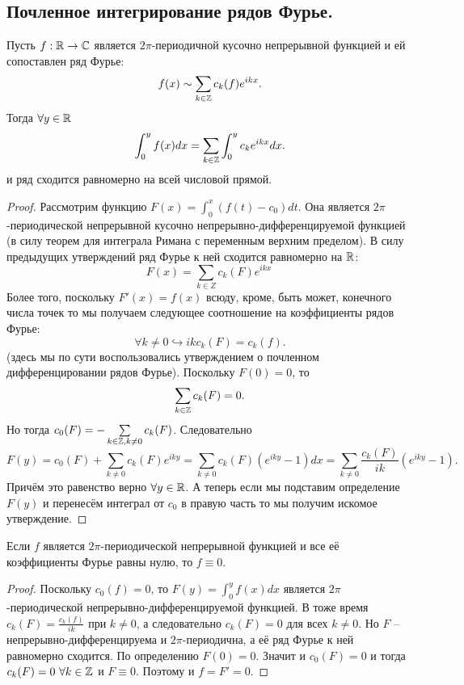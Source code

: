 \subsection{Почленное интегрирование рядов Фурье.}
\begin{theorem}
    Пусть $f: \mathbb{R} \to \mathbb{C}$ является $2\pi$-периодичной кусочно непрерывной функцией и ей сопоставлен ряд Фурье:
    \[
        f(x) \sim \sum\limits_{k \in \mathbb{Z}} c_k(f) e^{ikx}.
    \]
    Тогда $\forall y \in \mathbb{R}$
    \[
        \int_0^{y}f(x)dx = \sum\limits_{k \in \mathbb{Z}} \int_0^{y} c_k e^{ikx}dx.
    \]
    и ряд сходится равномерно на всей числовой прямой.
\end{theorem}
\begin{proof}
    Рассмотрим функцию $F(x) = \int_0^{x} (f(t) - c_0)dt$.
    Она является $2\pi$-периодической непрерывной кусочно непрерывно-дифференцируемой функцией (в силу теорем для интеграла Римана с переменным верхним пределом).
    В силу предыдущих утверждений ряд Фурье к ней сходится равномерно на $\mathbb{R}$:
    \[
        F(x) = \sum\limits_{k \in Z} c_k(F) e^{ikx} \
    \]
    Более того, поскольку $F'(x) = f(x)$ всюду, кроме, быть может, конечного числа точек то мы получаем следующее соотношение на коэффициенты рядов Фурье:
    \[
        \forall k \neq 0 \hookrightarrow ik c_k(F) = c_k(f).
    \]
    (здесь мы по сути воспользовались утверждением о почленном дифференцировании рядов Фурье).
    Поскольку $F(0) = 0$, то
    \[
        \sum\limits_{k \in \mathbb{Z}} c_k(F) = 0.
    \]
    Но тогда $c_0(F) = -\sum\limits_{k \in \mathbb{Z}, k \neq 0} c_k(F)$.
    Следовательно
    \[
        F(y) = c_0(F) + \sum\limits_{k \neq 0} c_k(F)e^{iky} = \sum\limits_{k \neq 0} c_k(F)(e^{iky} - 1)dx = \sum\limits_{k \neq 0} \dfrac{c_k(F)}{ik}(e^{iky} - 1).
    \]
    Причём это равенство верно $\forall y \in \mathbb{R}$.
    А теперь если мы подставим определение $F(y)$ и перенесём интеграл от $c_0$ в правую часть то мы получим искомое утверждение.
\end{proof}
\begin{corollary}
    Если $f$ является $2\pi$-периодической непрерывной функцией и все её коэффициенты Фурье равны нулю, то $f \equiv 0$.
\end{corollary}

\begin{proof}
    Поскольку $c_0(f) = 0$, то $F(y) = \int_0^{y} f(x)dx$ является $2\pi$-периодической непрерывно-дифференцируемой функцией.
    В тоже время $c_k(F) = \frac{c_k(f)}{ik}$ при $k \neq 0$, а следовательно $c_k(F) = 0$ для всех $k \neq 0$.
    Но $F$ -- непрерывно-дифференцируема и $2\pi$-периодична, а её ряд Фурье к ней равномерно сходится.
    По определению $F(0) = 0$.
    Значит и $c_0(F) = 0$ и тогда $c_k(F) = 0 \  \forall k \in \mathbb{Z}$ и $F \equiv 0$.
    Поэтому и $f = F' = 0$.
\end{proof}
